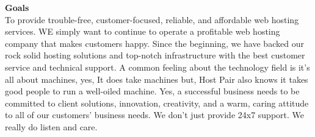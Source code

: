 \documentclass[a4paper,12pt]{report}
\begin{document}
\newpage
\textbf{Goals}\\
To provide trouble-free, customer-focused, reliable, and affordable web hosting services. WE simply want
to continue to operate a profitable web hosting company that makes customers happy. Since the
beginning, we have backed our rock solid hosting solutions and top-notch infrastructure with the best
customer service and technical support. A common feeling about the technology field is it's all about
machines, yes, It does take machines but, Host Pair also knows it takes good people to run a well-oiled
machine. Yes, a successful business needs to be committed to client solutions, innovation, creativity, and
a warm, caring attitude to all of our customers' business needs. We don't just provide 24x7 support. We
really do listen and care.
\end{document}
